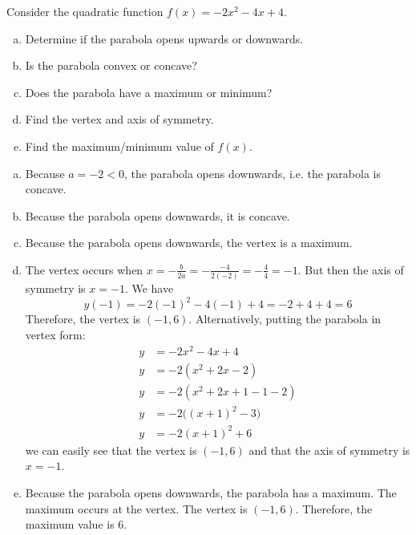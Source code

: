 \documentclass[11pt,letterpaper]{article}
\begin{document}
 Consider the quadratic function $f(x)= -2x^2 - 4x + 4$.
\begin{enumerate}[(a)]
\item Determine if the parabola opens upwards or downwards.
\item Is the parabola convex or concave?
\item Does the parabola have a maximum or minimum? 
\item Find the vertex and axis of symmetry. 
\item Find the maximum/minimum value of $f(x)$. 
\end{enumerate} \pspace

\sol
\begin{enumerate}[(a)]
\item Because $a= -2 < 0$, the parabola opens downwards, i.e. the parabola is concave. \pspace

\item Because the parabola opens downwards, it is concave. \pspace

\item Because the parabola opens downwards, the vertex is a maximum. \pspace

\item The vertex occurs when $x= -\frac{b}{2a}= -\frac{-4}{2(-2)}= -\frac{4}{4}= -1$. But then the axis of symmetry is $x= -1$. We have
	\[
	y(-1)= -2(-1)^2 - 4(-1) + 4= -2 + 4 + 4= 6
	\]
Therefore, the vertex is $(-1, 6)$. Alternatively, putting the parabola in vertex form:
	\[
	\begin{aligned}
	y&= -2x^2 - 4x + 4 \\[0.3cm]
	y&= -2(x^2 + 2x - 2) \\[0.3cm]
	y&= -2(x^2 + 2x + 1 - 1 - 2) \\[0.3cm]
	y&= -2\big( (x + 1)^2  - 3 \big) \\[0.3cm]
	y&= -2(x + 1)^2 + 6
	\end{aligned}
	\]
we can easily see that the vertex is $(-1, 6)$ and that the axis of symmetry is $x= -1$. \pspace

\item Because the parabola opens downwards, the parabola has a maximum. The maximum occurs at the vertex. The vertex is $(-1, 6)$. Therefore, the maximum value is $6$. 
\end{enumerate}


\end{document}
